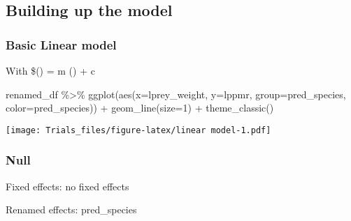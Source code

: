 \documentclass[
]{article}
\newenvironment{Shaded}{\begin{snugshade}}{\end{snugshade}}
\newcommand{\AttributeTok}[1]{\textcolor[rgb]{0.77,0.63,0.00}{#1}}
\newcommand{\DecValTok}[1]{\textcolor[rgb]{0.00,0.00,0.81}{#1}}
\newcommand{\FunctionTok}[1]{\textcolor[rgb]{0.00,0.00,0.00}{#1}}
\newcommand{\NormalTok}[1]{#1}
\newcommand{\SpecialCharTok}[1]{\textcolor[rgb]{0.00,0.00,0.00}{#1}}
\begin{document}
\hypertarget{building-up-the-model}{%
\subsection{Building up the model}\label{building-up-the-model}}

\hypertarget{basic-linear-model}{%
\subsubsection{Basic Linear model}\label{basic-linear-model}}

With \$\log() = m \times \log() + c

\begin{Shaded}
\begin{Highlighting}[]
\NormalTok{renamed\_df }\SpecialCharTok{\%\textgreater{}\%} 
    \FunctionTok{ggplot}\NormalTok{(}\FunctionTok{aes}\NormalTok{(}\AttributeTok{x=}\NormalTok{lprey\_weight, }\AttributeTok{y=}\NormalTok{lppmr, }\AttributeTok{group=}\NormalTok{pred\_species, }\AttributeTok{color=}\NormalTok{pred\_species)) }\SpecialCharTok{+} 
    \FunctionTok{geom\_line}\NormalTok{(}\AttributeTok{size=}\DecValTok{1}\NormalTok{) }\SpecialCharTok{+} \FunctionTok{theme\_classic}\NormalTok{()}
\end{Highlighting}
\end{Shaded}

\texttt{[image: Trials\_files/figure-latex/linear model-1.pdf]}

\hypertarget{null}{%
\subsubsection{Null}\label{null}}

Fixed effects: no fixed effects

Renamed effects: pred\_species
\end{document}
